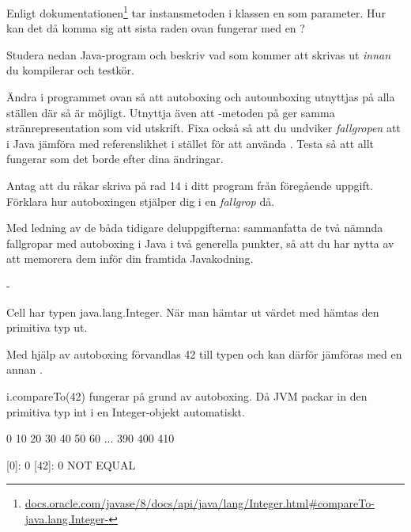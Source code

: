 \Subtask\Pen Enligt dokumentationen\footnote{\href{https://docs.oracle.com/javase/8/docs/api/java/lang/Integer.html\#compareTo-java.lang.Integer-}{docs.oracle.com/javase/8/docs/api/java/lang/Integer.html\#compareTo-java.lang.Integer-}} tar instansmetoden  i klassen  en  som parameter. Hur kan det då komma sig att sista raden ovan fungerar med en ?

\Subtask Studera nedan Java-program och beskriv vad som kommer att skrivas ut \emph{innan} du kompilerar och testkör.


\Subtask Ändra i programmet ovan så att autoboxing och autounboxing utnyttjas på alla ställen där så är möjligt. Utnyttja även att -metoden på  ger samma stränrepresentation som  vid utskrift. Fixa också så att du undviker \emph{fallgropen} att i Java jämföra med referenslikhet i stället för att använda . Testa så att allt fungerar som det borde efter dina ändringar.


\Subtask\Pen Antag att du råkar skriva  på rad 14 i ditt program från föregående uppgift. Förklara hur autoboxingen stjälper dig i en \emph{fallgrop} då.

\Subtask\Pen Med ledning av de båda tidigare deluppgifterna: sammanfatta de två nämnda fallgropar med autoboxing i Java i två generella punkter, så att du har nytta av att memorera dem inför din framtida Javakodning.


\SOLUTION


\TaskSolved \what

\SubtaskSolved   -

\SubtaskSolved   Cell har typen java.lang.Integer. När man hämtar ut värdet med  hämtas den primitiva typ  ut.

\SubtaskSolved   Med hjälp av autoboxing förvandlas 42 till typen  och kan därför jämföras med en annan .

\SubtaskSolved   i.compareTo(42) fungerar på grund av autoboxing. Då JVM packar in den primitiva typ int i en Integer-objekt automatiskt.

\SubtaskSolved
\begin{REPLnonum}
0 10 20 30 40 50 60 ... 390 400 410

[0]: 0
[42]: 0
NOT EQUAL
\end{REPLnonum}

